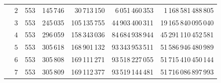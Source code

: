 \documentclass[11pt, a4paper, abstract=yes]{scrartcl}
\theoremstyle{definition}
\theoremstyle{remark}
\theoremstyle{plain}
\begin{document}
\begin{center}
\begin{tabular}{@{}ccrrrrr@{}}
 & \(2\) & 553 & 145\,746 & 30\,713\,150 & 6\,051\,460\,353 & 1\,168\,581\,488\,805\\
 & \(3\) & 553 & 245\,035 & 105\,135\,755 & 44\,903\,400\,311 & 19\,165\,840\,095\,040\\
 & \(4\) & 553 & 296\,059 & 158\,343\,036 & 84\,684\,938\,944 & 45\,291\,110\,452\,581\\
 & \(5\) & 553 & 305\,618 & 168\,901\,132 & 93\,343\,953\,511 & 51\,586\,946\,480\,989\\
 & \(6\) & 553 & 305\,808 & 169\,111\,271 & 93\,518\,227\,055 & 51\,715\,410\,450\,144\\
 & \(7\) & 553 & 305\,809 & 169\,112\,377 & 93\,519\,144\,481 & 51\,716\,086\,897\,993\\
\bottomrule
\end{tabular}
\end{center}
\endgroup
{}
\label{tab-app-imp}
\end{document}
